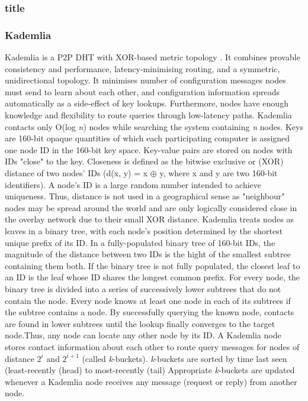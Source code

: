 \subsubsection{title}

\subsubsection{Kademlia}
Kademlia is a P2P DHT with XOR-based metric topology \cite{Maymounkov:2002:KPI:646334.687801}. It combines provable consistency and performance, latency-minimising routing, and a symmetric, unidirectional topology. It minimises number of configuration messages nodes must send to learn about each other, and configuration information spreads automatically as a side-effect of key lookups. Furthermore, nodes have enough knowledge and flexibility to route queries through low-latency paths.
Kademlia contacts only O(log \textit{n}) nodes while searching the system containing \textit{n} nodes. Keys are 160-bit opaque quantities of which each participating computer is assigned one node ID in the 160-bit key space. Key-value pairs are stored on nodes with IDs "close" to the key. Closeness is defined as the bitwise exclusive or (XOR) distance of two nodes' IDs (d(x, y) = x $\mathbin{\oplus}$ y, where x and y are two 160-bit identifiers). A node's ID is a large random number intended to achieve uniqueness. Thus, distance is not used in a geographical sense as "neighbour" nodes may be spread around the world and are only logically considered close in the overlay network due to their small XOR distance. Kademlia treats nodes as leaves in a binary tree, with each node's position determined by the shortest unique prefix of its ID. In a fully-populated binary tree of 160-bit IDs, the magnitude of the distance between two IDs is the hight of the smallest subtree containing them both. If the binary tree is not fully populated, the closest leaf to an ID is the leaf whose ID shares the longest common prefix. For every node, the binary tree is divided into a series of successively lower subtrees that do not contain the node. Every node knows at least one node in each of its subtrees if the subtree contains a node. By successfully querying the known node, contacts are found in lower subtrees until the lookup finally converges to the target node.Thus, any node can locate any other node by its ID.
A Kademlia node stores contact information about each other to route query messages for nodes of distance $2^i$ and $2^{i+1}$ (called \textit{k}-buckets). \textit{k}-buckets are sorted by time last seen (least-recently (head) to most-recently (tail) Appropriate \textit{k}-buckets are updated whenever a Kademlia node receives any message (request or reply) from another node. 


